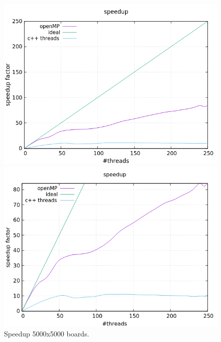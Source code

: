 \documentclass[a4paper,10pt]{article}
\begin{document}
\begin{figure}[H]
	\centering
	\begin{minipage}[t]{0.55\linewidth}
		\includegraphics[width=\linewidth]{5000_standard_speed.png}
	\end{minipage}%
	\begin{minipage}[t]{0.55\linewidth}
		\includegraphics[width=\linewidth]{5000_zoomed_speed.png}
	\end{minipage}
	\caption{Speedup 5000x5000 boards.}
	\label{50000}
\end{figure}
\end{document}
